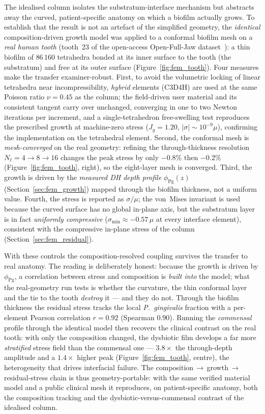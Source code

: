 The idealised column isolates the substratum-interface mechanism but abstracts away the
curved, patient-specific anatomy on which a biofilm actually grows. To establish that the
result is not an artefact of the simplified geometry, the \emph{identical}
composition-driven growth model was applied to a conformal biofilm mesh on a \emph{real
human tooth} (tooth~23 of the open-access Open-Full-Jaw
dataset~\cite{gholamalizadeh2022open}): a thin biofilm of $86\,160$ tetrahedra bonded at
its inner surface to the tooth (the substratum) and free at its outer surface
(Figure~\ref{fig:fem_tooth}). Four measures make the transfer examiner-robust. First, to
avoid the volumetric locking of linear tetrahedra near incompressibility, \emph{hybrid}
elements (C3D4H) are used at the same Poisson ratio $\nu=0.45$ as the column; the
field-driven user material and its consistent tangent carry over unchanged, converging in
one to two Newton iterations per increment, and a single-tetrahedron free-swelling test
reproduces the prescribed growth at machine-zero stress ($J_g=1.20$,
$\lvert\sigma\rvert\sim10^{-9}\mu$), confirming the implementation on the tetrahedral
element. Second, the conformal mesh is \emph{mesh-converged} on the real geometry:
refining the through-thickness resolution $N_\ell=4\!\to\!8\!\to\!16$ changes the peak
stress by only $-0.8\%$ then $-0.2\%$ (Figure~\ref{fig:fem_tooth}, right), so the
eight-layer mesh is converged. Third, the growth is driven by the \emph{measured DH depth
profile} $\phi_\mathrm{Pg}(z)$ (Section~\ref{sec:fem_growth}) mapped through the biofilm
thickness, not a uniform value. Fourth, the stress is reported as $\sigma/\mu$; the
von~Mises invariant is used because the curved surface has no global in-plane axis, but
the substratum layer is in fact \emph{uniformly compressive}
($\sigma_{\min}\approx-0.57\,\mu$ at every interface element), consistent with the
compressive in-plane stress of the column (Section~\ref{sec:fem_residual}).

With these controls the composition-resolved coupling survives the transfer to real
anatomy. The reading is deliberately honest: because the growth is driven by
$\phi_\mathrm{Pg}$, a correlation between stress and composition is \emph{built into} the
model; what the real-geometry run tests is whether the curvature, the thin conformal layer
and the tie to the tooth \emph{destroy} it --- and they do not. Through the biofilm
thickness the residual stress tracks the local \textit{P.~gingivalis} fraction with a
per-element Pearson correlation $r=0.92$ (Spearman $0.90$). Running the \emph{commensal}
profile through the identical model then recovers the clinical contrast on the real tooth:
with only the composition changed, the dysbiotic film develops a far more
\emph{stratified} stress field than the commensal one --- $3.8\times$ the through-depth
amplitude and a $1.4\times$ higher peak (Figure~\ref{fig:fem_tooth}, centre), the
heterogeneity that drives interfacial failure. The
composition\,$\rightarrow$\,growth\,$\rightarrow$\,residual-stress chain is thus
geometry-portable: with the same verified material model and a public clinical mesh it
reproduces, on patient-specific anatomy, both the composition tracking and the
dysbiotic-versus-commensal contrast of the idealised column.

